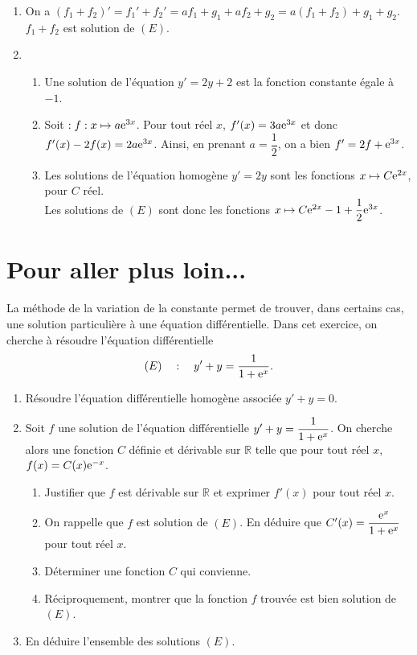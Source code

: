 \documentclass[11pt,fleqn, openany]{book} %
\begin{document}
\begin{solution} \hspace{0pt}
\begin{enumerate} \item On a $(f_1+f_2)'=f_1'+f_2'=af_1+g_1+af_2+g_2=a(f_1+f_2)+g_1+g_2$.  \(f_1+f_2\) est solution de \((E)\).
\item \begin{enumerate}\item Une solution de l'équation $y'=2y+2$ est la fonction constante égale à $-1$.
\item Soit $:f:x\mapsto a\mathrm{e}^{3x}$. Pour tout réel $x$, $f'(x)=3a\mathrm{e}^{3x}$ et donc $f'(x)-2f(x)=2a\mathrm{e}^{3x}$. Ainsi, en prenant $a=\dfrac{1}{2}$, on a bien $f'=2f+\mathrm{e}^{3x}$.
\item Les solutions de l'équation homogène $y'=2y$ sont les fonctions $x \mapsto C\mathrm{e}^{2x}$, pour $C$ réel. \\ Les solutions de $(E)$ sont donc les fonctions $x\mapsto C\mathrm{e}^{2x}-1+\dfrac{1}{2}\mathrm{e}^{3x}$.\end{enumerate}\end{enumerate}
\end{solution}



\section*{Pour aller plus loin...}


\begin{exercise}[topic=diff04, subtitle={(Variation de la constante)}] La méthode de la variation de la constante permet de trouver, dans certains cas, une solution particulière à une équation différentielle. Dans cet exercice, on cherche à résoudre l'équation différentielle 
\[(E)\quad : \quad y'+y=\dfrac{1}{1+\mathrm{e}^x}.\]
\begin{enumerate}
\item Résoudre l'équation différentielle homogène associée $y'+y=0$.
\item Soit $f$ une solution de l'équation différentielle $y'+y=\dfrac{1}{1+\mathrm{e}^x}$. On cherche alors une fonction $C$ définie et dérivable sur $\mathbb{R}$ telle que pour tout réel $x$, $f(x)=C(x)\mathrm{e}^{-x}$.
\vskip5pt
\begin{enumerate}
\item Justifier que $f$ est dérivable sur $\mathbb{R}$ et exprimer $f'(x)$ pour tout réel $x$.
\item On rappelle que $f$ est solution de $(E)$. En déduire que $C'(x)=\dfrac{\mathrm{e}^x}{1+\mathrm{e}^x}$ pour tout réel $x$.
\item Déterminer une fonction $C$ qui convienne.
\item Réciproquement, montrer que la fonction $f$ trouvée est bien solution de $(E)$.
\end{enumerate}
\item En déduire l'ensemble des solutions $(E)$.
\end{enumerate}\end{exercise}
\end{document}
